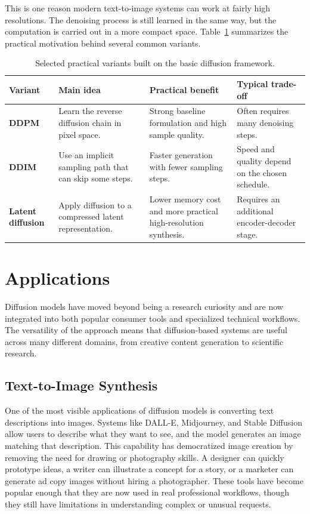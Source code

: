 \documentclass[a4paper,12pt]{article}
\begin{document}
This is one reason modern text-to-image systems can work at fairly high resolutions. The denoising process is still learned in the same way, but the computation is carried out in a more compact space. Table~\ref{tab:practical-variants} summarizes the practical motivation behind several common variants.

\begin{table}[H]
    \centering
    {\small
    \begin{tabularx}{\linewidth}{>{\raggedright\arraybackslash\bfseries}p{2.1cm}>{\raggedright\arraybackslash}p{3.1cm}>{\raggedright\arraybackslash}p{3.0cm}>{\raggedright\arraybackslash}X}
        \toprule
        Variant & Main idea & Practical benefit & Typical trade-off \\
        \midrule
        DDPM & Learn the reverse diffusion chain in pixel space. & Strong baseline formulation and high sample quality. & Often requires many denoising steps. \\
        DDIM & Use an implicit sampling path that can skip some steps. & Faster generation with fewer sampling steps. & Speed and quality depend on the chosen schedule. \\
        Latent diffusion & Apply diffusion to a compressed latent representation. & Lower memory cost and more practical high-resolution synthesis. & Requires an additional encoder-decoder stage. \\
        \bottomrule
    \end{tabularx}
    }
    \caption[Selected practical variants of diffusion models]{Selected practical variants built on the basic diffusion framework.}
    \label{tab:practical-variants}
\end{table}

\section{Applications}
Diffusion models have moved beyond being a research curiosity and are now integrated into both popular consumer tools and specialized technical workflows. The versatility of the approach means that diffusion-based systems are useful across many different domains, from creative content generation to scientific research.

\subsection{Text-to-Image Synthesis}
One of the most visible applications of diffusion models is converting text descriptions into images. Systems like DALL-E, Midjourney, and Stable Diffusion allow users to describe what they want to see, and the model generates an image matching that description. This capability has democratized image creation by removing the need for drawing or photography skills. A designer can quickly prototype ideas, a writer can illustrate a concept for a story, or a marketer can generate ad copy images without hiring a photographer. These tools have become popular enough that they are now used in real professional workflows, though they still have limitations in understanding complex or unusual requests.
\end{document}
